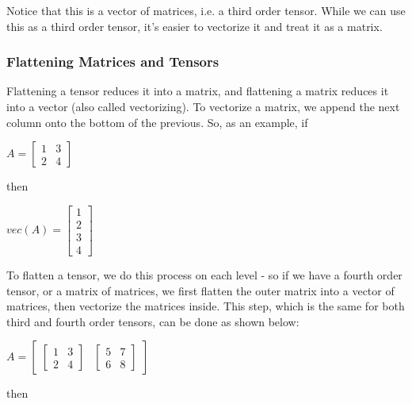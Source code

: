\documentclass[twocolumn,10pt]{asme2ej}
\begin{document}
Notice that this is a vector of matrices, i.e. a third order tensor. While we can use this as a third order tensor, it's easier to vectorize it and treat it as a matrix.

\subsubsection{Flattening Matrices and Tensors}

Flattening a tensor reduces it into a matrix, and flattening a matrix reduces it into a vector (also called vectorizing). To vectorize a matrix, we append the next column onto the bottom of the previous. So, as an example, if

\bigskip
\begin{center}
$A = \begin{bmatrix} 1 & 3 \\ 2 & 4 \end{bmatrix}$
\end{center}

then

\begin{center}
$vec(A) = \begin{bmatrix} 1 \\ 2 \\ 3 \\ 4 \end{bmatrix}$
\end{center}

To flatten a tensor, we do this process on each level - so if we have a fourth order tensor, or a matrix of matrices, we first flatten the outer matrix into a vector of matrices, then vectorize the matrices inside. This step, which is the same for both third and fourth order tensors, can be done as shown below:

\bigskip
\begin{center}
$A = \begin{bmatrix} \begin{bmatrix} 1 & 3 \\ 2 & 4 \end{bmatrix} & \begin{bmatrix} 5 & 7 \\ 6 & 8 \end{bmatrix} \end{bmatrix}$
\end{center}

then
\end{document}
